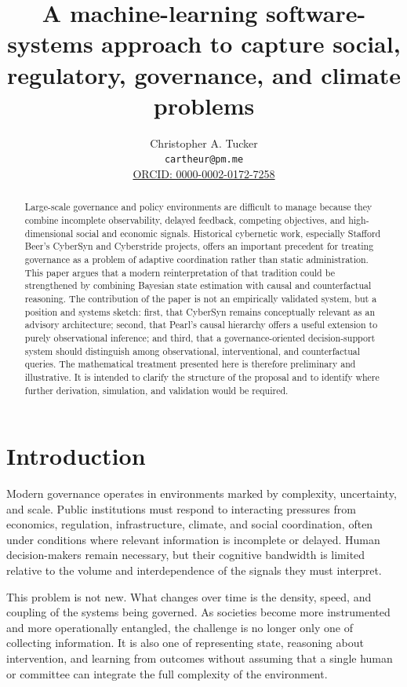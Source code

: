 \documentclass[11pt]{article}
\title{A machine-learning software-systems approach to capture social,\\
regulatory, governance, and climate problems}
\author{Christopher A. Tucker\\
\small \texttt{cartheur@pm.me}\\
\small \href{https://orcid.org/0000-0002-0172-7258}{ORCID: 0000-0002-0172-7258}}
\date{}
\begin{document}
\maketitle

\begin{abstract}
Large-scale governance and policy environments are difficult to manage because they combine incomplete observability, delayed feedback, competing objectives, and high-dimensional social and economic signals. Historical cybernetic work, especially Stafford Beer's CyberSyn and Cyberstride projects, offers an important precedent for treating governance as a problem of adaptive coordination rather than static administration. This paper argues that a modern reinterpretation of that tradition could be strengthened by combining Bayesian state estimation with causal and counterfactual reasoning. The contribution of the paper is not an empirically validated system, but a position and systems sketch: first, that CyberSyn remains conceptually relevant as an advisory architecture; second, that Pearl's causal hierarchy offers a useful extension to purely observational inference; and third, that a governance-oriented decision-support system should distinguish among observational, interventional, and counterfactual queries. The mathematical treatment presented here is therefore preliminary and illustrative. It is intended to clarify the structure of the proposal and to identify where further derivation, simulation, and validation would be required.
\end{abstract}

\onehalfspacing

\section{Introduction}

Modern governance operates in environments marked by complexity, uncertainty, and scale. Public institutions must respond to interacting pressures from economics, regulation, infrastructure, climate, and social coordination, often under conditions where relevant information is incomplete or delayed. Human decision-makers remain necessary, but their cognitive bandwidth is limited relative to the volume and interdependence of the signals they must interpret.

This problem is not new. What changes over time is the density, speed, and coupling of the systems being governed. As societies become more instrumented and more operationally entangled, the challenge is no longer only one of collecting information. It is also one of representing state, reasoning about intervention, and learning from outcomes without assuming that a single human or committee can integrate the full complexity of the environment.
\end{document}
